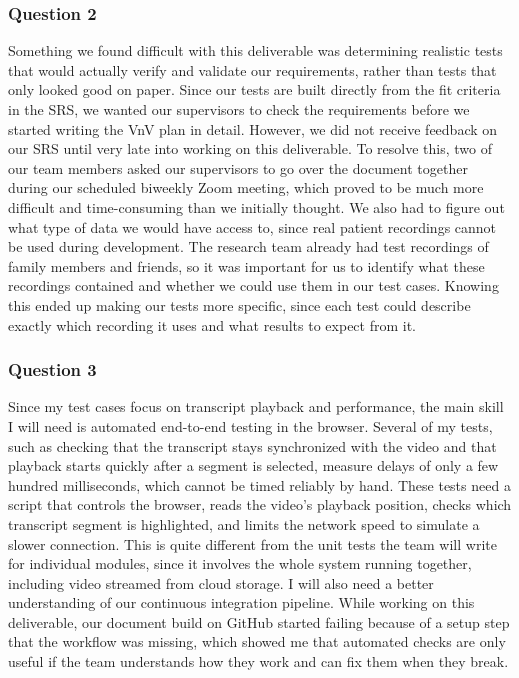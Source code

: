 \documentclass[12pt, titlepage]{article}
\renewcommand{\_}{\oldunderscore\allowbreak}
\begin{document}
\subsubsection*{Question 2}
Something we found difficult with this deliverable was determining realistic tests that would actually verify and validate our requirements, rather than tests that only looked good on paper. 
Since our tests are built directly from the fit criteria in the SRS, we wanted our supervisors to check the requirements before we started writing the VnV plan in detail. 
However, we did not receive feedback on our SRS until very late into working on this deliverable. 
To resolve this, two of our team members asked our supervisors to go over the document together during our scheduled biweekly Zoom meeting, which proved to be much more difficult and time-consuming than we initially thought. 
We also had to figure out what type of data we would have access to, since real patient recordings cannot be used during development. 
The research team already had test recordings of family members and friends, so it was important for us to identify what these recordings contained and whether we could use them in our test cases. 
Knowing this ended up making our tests more specific, since each test could describe exactly which recording it uses and what results to expect from it.

\subsubsection*{Question 3}
Since my test cases focus on transcript playback and performance, the main skill I will need is automated end-to-end testing in the browser. 
Several of my tests, such as checking that the transcript stays synchronized with the video and that playback starts quickly after a segment is selected, measure delays of only a few hundred milliseconds, which cannot be timed reliably by hand. 
These tests need a script that controls the browser, reads the video's playback position, checks which transcript segment is highlighted, and limits the network speed to simulate a slower connection. 
This is quite different from the unit tests the team will write for individual modules, since it involves the whole system running together, including video streamed from cloud storage. 
I will also need a better understanding of our continuous integration pipeline. 
While working on this deliverable, our document build on GitHub started failing because of a setup step that the workflow was missing, which showed me that automated checks are only useful if the team understands how they work and can fix them when they break.
\end{document}
